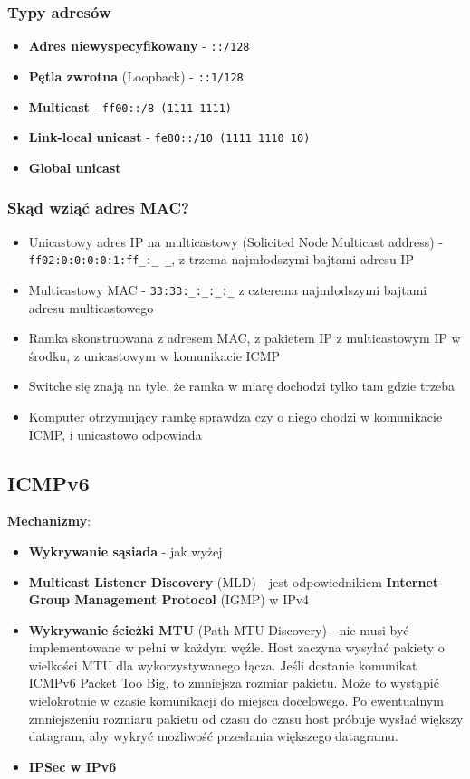 \documentclass[../main.tex]{subfiles}
\begin{document}
    \subsubsection{Typy adresów}
    \begin{itemize}
        \item \textbf{Adres niewyspecyfikowany} - \texttt{::/128}
        \item \textbf{Pętla zwrotna} (Loopback) - \texttt{::1/128}
        \item \textbf{Multicast} - \texttt{ff00::/8 (1111 1111)}
        \item \textbf{Link-local unicast} - \texttt{fe80::/10 (1111 1110 10)}
        \item \textbf{Global unicast}
    \end{itemize}


    \subsubsection{Skąd wziąć adres MAC?}
    \begin{itemize}
        \item Unicastowy adres IP na multicastowy (Solicited Node Multicast address) - \texttt{ff02:0:0:0:0:1:ff\_:\_ \_},
        z trzema najmłodszymi bajtami adresu IP
        \item Multicastowy MAC - \texttt{33:33:\_:\_:\_:\_} z czterema najmłodszymi bajtami adresu multicastowego
        \item Ramka skonstruowana z adresem MAC, z pakietem IP z multicastowym IP w środku, z unicastowym w komunikacie ICMP
        \item Switche się znają na tyle, że ramka w miarę dochodzi tylko tam gdzie trzeba
        \item Komputer otrzymujący ramkę sprawdza czy o niego chodzi w komunikacie ICMP, i unicastowo odpowiada
    \end{itemize}

    \subsection{ICMPv6}
    \textbf{Mechanizmy}:
    \begin{itemize}
        \item \textbf{Wykrywanie sąsiada} - jak wyżej
        \item \textbf{Multicast Listener Discovery} (MLD) - jest odpowiednikiem \textbf{Internet Group Management Protocol} (IGMP) w IPv4
        \item \textbf{Wykrywanie ścieżki MTU} (Path MTU Discovery) - nie musi być implementowane w pełni w każdym węźle.
        Host zaczyna wysyłać pakiety o wielkości MTU dla wykorzystywanego łącza.
        Jeśli dostanie komunikat ICMPv6 Packet Too Big, to zmniejsza rozmiar pakietu.
        Może to wystąpić wielokrotnie w czasie komunikacji do miejsca docelowego.
        Po ewentualnym zmniejszeniu rozmiaru pakietu od czasu do czasu host próbuje wysłać
        większy datagram, aby wykryć możliwość przesłania większego datagramu.
        \item \textbf{IPSec w IPv6}
    \end{itemize}
\end{document}
